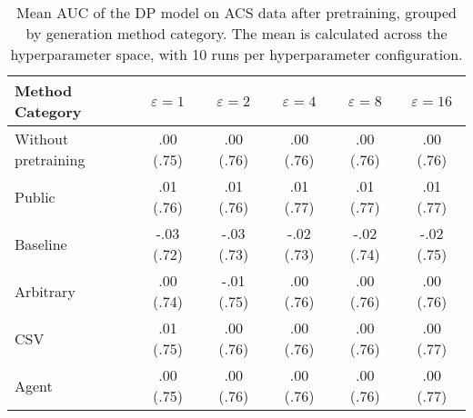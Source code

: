 \begin{table}[h!]
    \centering
    \caption{Mean AUC of the DP model on ACS data after pretraining, grouped by generation method category. The mean is calculated across the hyperparameter space, with 10 runs per hyperparameter configuration.}
    \label{tab:epsilon_comparison}
    \begin{tabular}{lccccc}
    \toprule
    Method Category & $\varepsilon=1$ & $\varepsilon=2$ & $\varepsilon=4$ & $\varepsilon=8$ & $\varepsilon=16$ \\
    \midrule
    Without pretraining & .00 {\small (.75)} & .00 {\small (.76)} & .00 {\small (.76)} & .00 {\small (.76)} & .00 {\small (.76)} \\
    \arrayrulecolor{black!50!}\midrule
    Public & \cellcolor{gold!30}.01 {\small (.76)} & \cellcolor{gold!30}.01 {\small (.76)} & \cellcolor{gold!30}.01 {\small (.77)} & \cellcolor{gold!30}.01 {\small (.77)} & \cellcolor{gold!30}.01 {\small (.77)} \\
    \arrayrulecolor{black!50!}\midrule
    Baseline & -.03 {\small (.72)} & -.03 {\small (.73)} & -.02 {\small (.73)} & -.02 {\small (.74)} & -.02 {\small (.75)} \\
    \arrayrulecolor{black!50!}\midrule
    Arbitrary & .00 {\small (.74)} & -.01 {\small (.75)} & \cellcolor{bronze!30}.00 {\small (.76)} & .00 {\small (.76)} & .00 {\small (.76)} \\
    \arrayrulecolor{black!50!}\midrule
    CSV & \cellcolor{silver!30}.01 {\small (.75)} & \cellcolor{silver!30}.00 {\small (.76)} & \cellcolor{silver!30}.00 {\small (.76)} & \cellcolor{silver!30}.00 {\small (.76)} & \cellcolor{bronze!30}.00 {\small (.77)} \\
    Agent & \cellcolor{bronze!30}.00 {\small (.75)} & \cellcolor{bronze!30}.00 {\small (.76)} & \cellcolor{silver!30}.00 {\small (.76)} & \cellcolor{bronze!30}.00 {\small (.76)} & \cellcolor{silver!30}.00 {\small (.77)} \\
    \bottomrule
    \end{tabular}
\end{table}